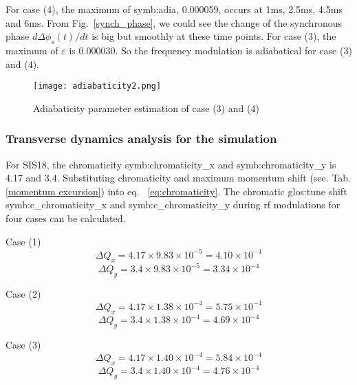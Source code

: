 \begin{itemize}
For case (4), the maximum of \gls{symb:adia}, 0.000059, occurs at 1ms, 2.5ms, 4.5ms and 6ms. From Fig.~\ref{synch_phase}, we could see the change of the synchronous phase $d\Delta \phi_s(t)/dt$  is big but smoothly at these time points. For case (3), the maximum of $\varepsilon$ is 0.000030. So the frequency modulation is adiabatical for case (3) and (4).


\begin{figure}[H]
   \centering   
   \texttt{[image: adiabaticity2.png]}
   \caption{Adiabaticity parameter estimation of case (3) and (4)}
   \label{adiabaticity2}
\end{figure}
\end{itemize}
\subsubsection{Transverse dynamics analysis for the simulation}
For SIS18, the chromaticity \gls{symb:chromaticity_x} and \gls{symb:chromaticity_y} is 4.17 and 3.4. Substituting chromaticity and maximum momentum shift (see. Tab. \ref{momentum excursion}) into eq. ~\ref{eq:chromaticity}. The chromatic \gls{glos:tune} shift \gls{symb:c_chromaticity_x} and \gls{symb:c_chromaticity_y} during rf modulations for four cases can be calculated. 

Case (1) 
\begin{equation}
\Delta Q_x = 4.17 \times 9.83 \times 10^{-5}=4.10 \times 10^{-4}
\end{equation}
\begin{equation}
\Delta Q_y = 3.4 \times 9.83 \times 10^{-5}=3.34 \times 10^{-4} 
\end{equation}

Case (2)
\begin{equation}
\Delta Q_x = 4.17 \times 1.38 \times 10^{-4}=5.75 \times 10^{-4}
\end{equation}
\begin{equation}
\Delta Q_y = 3.4 \times 1.38 \times 10^{-4}=4.69 \times 10^{-4} 
\end{equation}

Case (3)
\begin{equation}
\Delta Q_x = 4.17 \times 1.40 \times 10^{-4}=5.84 \times 10^{-4}
\end{equation}
\begin{equation}
\Delta Q_y = 3.4 \times 1.40 \times 10^{-4}=4.76 \times 10^{-4} 
\end{equation}

